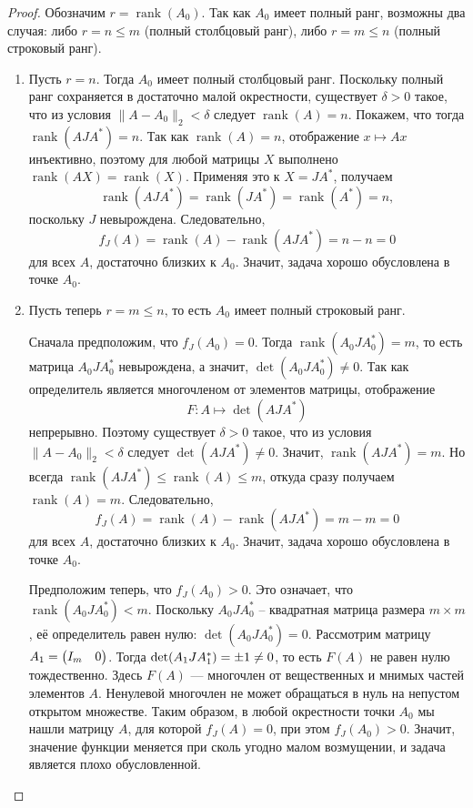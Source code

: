 \documentclass[a4paper,12pt]{article}
\DeclareMathOperator{\rank}{rank}
\theoremstyle{csstyle}
\begin{document}
\begin{proof}
    Обозначим $r=\rank(A_0)$. Так как $A_0$ имеет полный ранг, возможны два случая:
    либо $r=n\le m$ (полный столбцовый ранг), либо $r=m\le n$ (полный строковый ранг).

    \begin{enumerate}[label=\arabic*)]
    \item Пусть $r=n$.
    Тогда $A_0$ имеет полный столбцовый ранг.
    Поскольку полный ранг сохраняется в достаточно малой окрестности, существует $\delta>0$ такое, что из условия $\|A-A_0\|_2<\delta$ следует $\rank(A)=n$.
    Покажем, что тогда $\rank(AJA^*)=n$.
    Так как $\rank(A)=n$, отображение $x\mapsto Ax$ инъективно, поэтому для любой матрицы $X$
    выполнено $\rank(AX)=\rank(X)$.
    Применяя это к $X=JA^*$, получаем
    \[
    \rank(AJA^*)=\rank(JA^*)=\rank(A^*)=n,
    \]
    поскольку $J$ невырождена.
    Следовательно,
    \[
    f_J(A)=\rank(A)-\rank(AJA^*)=n-n=0
    \]
    для всех $A$, достаточно близких к $A_0$.
    Значит, задача хорошо обусловлена в точке $A_0$.
    
    \item Пусть теперь $r=m\le n$, то есть $A_0$ имеет полный строковый ранг.
    
    Сначала предположим, что $f_J(A_0)=0$.
    Тогда $\rank(A_0JA_0^*)=m$, то есть матрица $A_0JA_0^*$ невырождена, а значит, $\det(A_0JA_0^*)\ne 0$.
    Так как определитель является многочленом от элементов матрицы, отображение
    \[
    F: A\mapsto \det(AJA^*)
    \]
    непрерывно.
    Поэтому существует $\delta>0$ такое, что из условия $\|A-A_0\|_2<\delta$
    следует $\det(AJA^*)\ne 0$.
    Значит, $\rank(AJA^*)=m$.
    Но всегда $\rank(AJA^*)\le \rank(A)\le m$,
    откуда сразу получаем $\rank(A)=m$.
    Следовательно,
    \[
    f_J(A)=\rank(A)-\rank(AJA^*)=m-m=0
    \]
    для всех $A$, достаточно близких к $A_0$.
    Значит, задача хорошо обусловлена в точке $A_0$.

    Предположим теперь, что $f_J(A_0) > 0$.
    Это означает, что $\rank(A_0 J A_0^*) < m$. Поскольку $A_0 J A_0^*$ -- квадратная матрица размера $m \times m$, её определитель равен нулю: $\det(A_0 J A_0^*) = 0$.
    Рассмотрим матрицу $A_{\rm 1} = \begin{pmatrix} I_m & 0 \end{pmatrix}$. Тогда $\det(A_{1} J A_{\rm 1}^*) = \pm 1\neq 0$, то есть $F(A)$ не равен нулю тождественно. Здесь $F(A)$ --- многочлен от вещественных и мнимых частей элементов $A$. Ненулевой многочлен не может обращаться в нуль на непустом открытом множестве.
    Таким образом, в любой окрестности точки $A_0$ мы нашли матрицу $A$, для которой $f_J(A) = 0$, при этом $f_J(A_0) > 0$. Значит, значение функции меняется при сколь угодно малом возмущении, и задача является плохо обусловленной.\qedhere
    \end{enumerate}
\end{proof}
\end{document}
